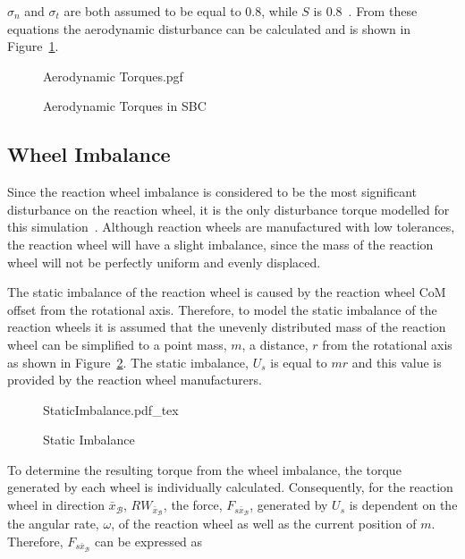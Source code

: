 $\sigma_n$ and $\sigma_t$ are both assumed to be equal to 0.8, while $S$ is $\num{0.8}$~\cite{steyn2011CubeSat}. From these equations the aerodynamic disturbance can be calculated and is shown in Figure~\ref{fig:AerodynamicTorques}.
\begin{figure}[!htb]
	\centering
	\def\pgfwidth{10cm}
	{Aerodynamic Torques.pgf}
	
	\caption{Aerodynamic Torques in SBC}
	\label{fig:AerodynamicTorques}
\end{figure}

\subsection{Wheel Imbalance}
Since the reaction wheel imbalance is considered to be the most significant disturbance on the reaction wheel, it is the only disturbance torque modelled for this simulation~\cite{bialke1998high}. Although reaction wheels are manufactured with low tolerances, the reaction wheel will have a slight imbalance, since the mass of the reaction wheel will not be perfectly uniform and evenly displaced. 

The static imbalance of the reaction wheel is caused by the reaction wheel CoM offset from the rotational axis. Therefore, to model the static imbalance of the reaction wheels it is assumed that the unevenly distributed mass of the reaction wheel can be simplified to a point mass, $m$, a distance, $r$ from the rotational axis as shown in Figure~\ref{fig:StaticImbalance}. The static imbalance, $U_s$ is equal to $mr$ and this value is provided by the reaction wheel manufacturers.

\begin{figure}[!htb]
	\centering
	\def\svgwidth{10cm}
	{StaticImbalance.pdf_tex}
	\caption{Static Imbalance}
	\label{fig:StaticImbalance}
\end{figure}

To determine the resulting torque from the wheel imbalance, the torque generated by each wheel is individually calculated. Consequently, for the reaction wheel in direction $\bar{x}_\mathcal{B}$, $RW_{\bar{x}_\mathcal{B}}$, the force, $F_{s\bar{x}_\mathcal{B}}$, generated by $U_s$ is dependent on the the angular rate, $\omega$, of the reaction wheel as well as the current position of $m$. Therefore, $F_{s\bar{x}_\mathcal{B}}$ can be expressed as


